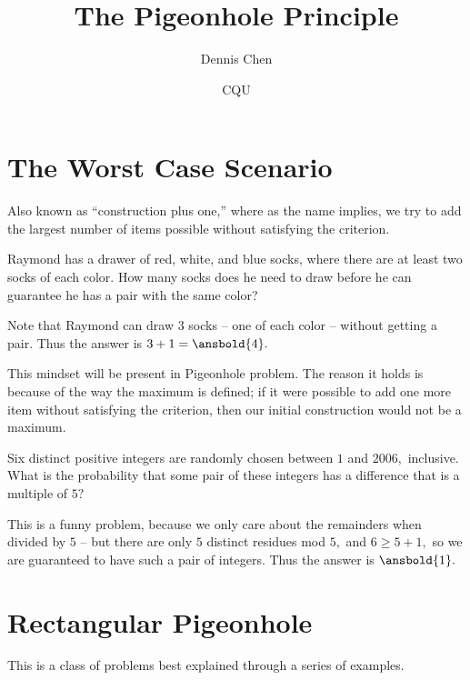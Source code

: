 \documentclass{article}
\title{The Pigeonhole Principle}
\author{Dennis Chen}
\date{CQU}
\begin{document}
\maketitle


\section{The Worst Case Scenario}

Also known as ``construction plus one,'' where as the name implies, we try to add the largest number of items possible without satisfying the criterion. 

\begin{exam}
Raymond has a drawer of red, white, and blue socks, where there are at least two socks of each color. How many socks does he need to draw before he can guarantee he has a pair with the same color?
\end{exam}

\begin{sol}
Note that Raymond can draw $3$ socks -- one of each color -- without getting a pair. Thus the answer is $3+1=\ansbold{4}.$
\end{sol}

This mindset will be present in  Pigeonhole problem. The reason it holds is because of the way the maximum is defined; if it were possible to add one more item without satisfying the criterion, then our initial construction would not be a maximum.

\begin{exam}[AMC 10A 2006/20]
Six distinct positive integers are randomly chosen between $1$ and $2006,$ inclusive. What is the probability that some pair of these integers has a difference that is a multiple of $5?$ 
\end{exam}

\begin{sol}
This is a funny problem, because we only care about the remainders when divided by $5$ -- but there are only $5$ distinct residues mod $5,$ and $6\geq 5+1,$ so we are guaranteed to have such a pair of integers. Thus the answer is $\ansbold{1}.$
\end{sol}

\section{Rectangular Pigeonhole}

This is a class of problems best explained through a series of examples.
\end{document}
